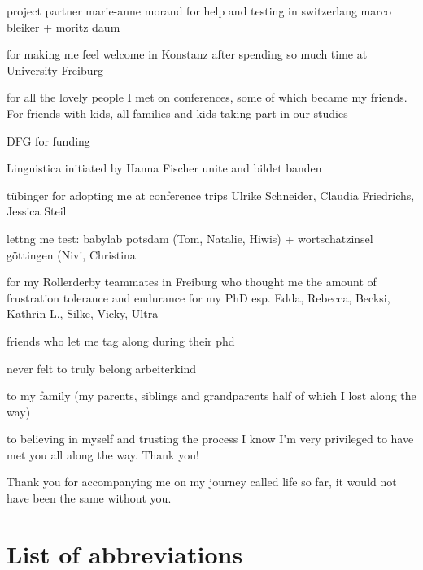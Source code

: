 \documentclass[
  11pt,
  a4paper,
  nottoc]{report}
\renewcommand*\contentsname{Table of contents}
\newcommand\contentsname{Table of contents}
\begin{document}
project partner marie-anne morand
for help and testing in switzerlang marco bleiker + moritz daum

for making me feel welcome in Konstanz after spending so much time at University Freiburg

for all the lovely people I met on conferences, some of which became my friends.
For friends with kids, all families and kids taking part in our studies

DFG for funding

Linguistica initiated by Hanna Fischer
unite and bildet banden

tübinger for adopting me at conference trips Ulrike Schneider, Claudia Friedrichs, Jessica Steil

lettng me test: babylab potsdam (Tom, Natalie, Hiwis) + wortschatzinsel göttingen (Nivi, Christina


for my Rollerderby teammates in Freiburg who thought me the amount of frustration tolerance and endurance for my PhD
esp. Edda, Rebecca, Becksi, Kathrin L., Silke, Vicky, Ultra

friends who let me tag along during their phd

never felt to truly belong
arbeiterkind

to my family (my parents, siblings and grandparents half of which I lost along the way)

to believing in myself and trusting the process
I know I'm very privileged to have met you all along the way.
Thank you!


Thank you for accompanying me on my journey called life so far, it would not have been the same without you.

\renewcommand*\contentsname{Contents}
{
\setcounter{tocdepth}{1}
\tableofcontents
}
\listoffigures
\listoftables
{}

\chapter*{List of abbreviations}\label{abbreviations}

\end{document}
